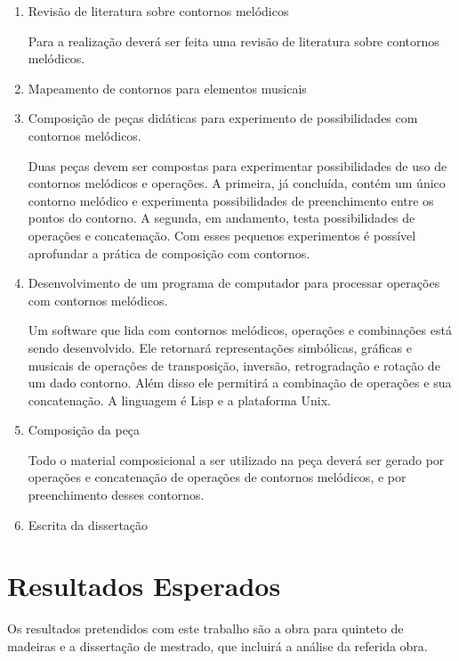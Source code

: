 \documentclass{article}
\begin{document}
\begin{enumerate}
\item Revisão de literatura sobre contornos melódicos

  Para a realização deverá ser feita uma revisão de literatura sobre
  contornos melódicos.

\item Mapeamento de contornos para elementos musicais

\item Composição de peças didáticas para experimento de possibilidades
  com contornos melódicos.

  Duas peças devem ser compostas para experimentar possibilidades de
  uso de contornos melódicos e operações. A primeira, já concluída,
  contém um único contorno melódico e experimenta possibilidades de
  preenchimento entre os pontos do contorno. A segunda, em andamento,
  testa possibilidades de operações e concatenação. Com esses pequenos
  experimentos é possível aprofundar a prática de composição com
  contornos.

\item Desenvolvimento de um programa de computador para processar
  operações com contornos melódicos.

  Um software que lida com contornos melódicos, operações e
  combinações está sendo desenvolvido. Ele retornará representações
  simbólicas, gráficas e musicais de operações de transposição,
  inversão, retrogradação e rotação de um dado contorno. Além disso
  ele permitirá a combinação de operações e sua concatenação. A
  linguagem é Lisp e a plataforma Unix.

  
\item Composição da peça

  Todo o material composicional a ser utilizado na peça deverá ser
  gerado por operações e concatenação de operações de contornos
  melódicos, e por preenchimento desses contornos.

\item Escrita da dissertação
\end{enumerate}

\section{Resultados Esperados}
\label{sec:resultados-esperados}

Os resultados pretendidos com este trabalho são a obra para quinteto
de madeiras e a dissertação de mestrado, que incluirá a análise da
referida obra.
\end{document}
